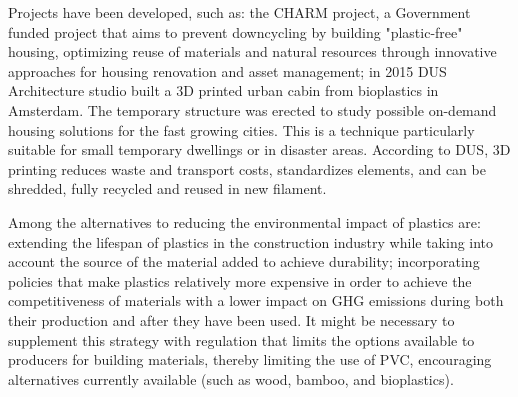 Projects have been developed, such as: the CHARM project, a Government funded project that aims to prevent downcycling by building "plastic-free" housing, optimizing reuse of materials and natural resources through innovative approaches for housing renovation and asset management;\autocite{asbp_2020} in 2015 DUS Architecture studio built a 3D printed urban cabin from bioplastics in Amsterdam. The temporary structure was erected to study possible on-demand housing solutions for the fast growing cities. This is a technique particularly suitable for small temporary dwellings or in disaster areas. According to DUS, 3D printing reduces waste and transport costs, standardizes elements, and can be shredded, fully recycled and reused in new filament.\autocite{lanko2017additive} 

Among the alternatives to reducing the environmental impact of plastics are: extending the lifespan of plastics in the construction industry while taking into account the source of the material added to achieve durability; incorporating policies that make plastics relatively more expensive in order to achieve the competitiveness of materials with a lower impact on GHG emissions during both their production and after they have been used. It might be necessary to supplement this strategy with regulation that limits the options available to producers for building materials, thereby limiting the use of PVC, encouraging alternatives currently available (such as wood, bamboo, and bioplastics). 



